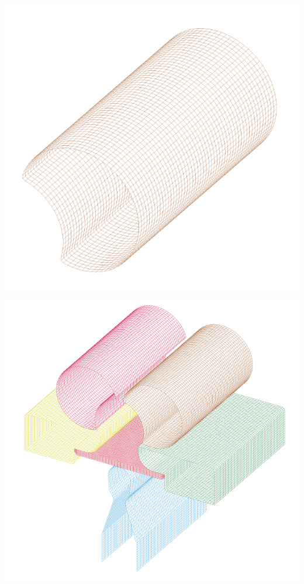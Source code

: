 \begin{center}
\includegraphics[scale=0.6]{src/ch3/mesh_leva.png}
\label{fig:mesh_leva}
\end{center}





\begin{center}
\includegraphics[scale=0.8]{src/ch3/parts_plot.png}
\label{fig:parts_plot}
\end{center}

